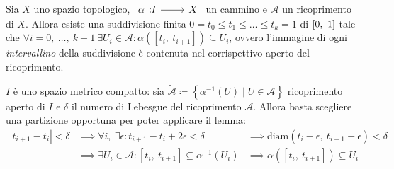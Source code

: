 \begin{corollary}~{}\label{corollario suddivisione}\\
Sia $X$ uno spazio topologico, $\funz \alpha I X$ un cammino e $\mathcal{A}$ un ricoprimento di $X$. Allora esiste una suddivisione finita $0=t_0\leq t_1\leq \dots\leq t_k=1$ di $\left[0,\ 1\right]$ tale che $\forall i=0,\ \dots,\ k-1 \ \exists U_i\in\mathcal{A} \colon \alpha([t_i,\ t_{i+1}])\subseteq U_i$, ovvero l'immagine di ogni \textit{intervallino} della suddivisione è contenuta nel corrispettivo aperto del ricoprimento.
\end{corollary}
\begin{demonstration}
	$I$ è uno spazio metrico compatto: sia $\widetilde{\mathcal{A}}\coloneqq \left\{ \alpha^{-1}(U)\mid U\in\mathcal{A}\right\}$ ricoprimento aperto di $I$ e $\delta$ il numero di Lebesgue del ricoprimento $\mathcal{A}$. Allora basta scegliere una partizione opportuna per poter applicare il lemma:
		\begin{equation*}
			\begin{array}{lll}
				|t_{i+1} - t_i|<\delta& \implies \forall i, \ \exists\epsilon \colon t_{i+1}-t_i+2\epsilon <\delta &\implies \text{diam}(t_i -\epsilon,\ t_{i+1}+\epsilon)<\delta\\
				&\implies \exists U_i\in\mathcal{A}\colon [t_i,\ t_{i+1}]\subseteq \alpha^{-1}(U_i) &\implies \alpha([t_i,\ t_{i+1}])\subseteq U_i
			\end{array}
		\end{equation*}
\end{demonstration}
